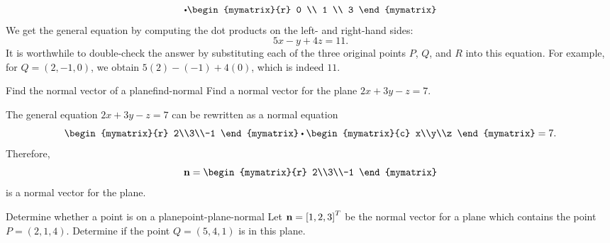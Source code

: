 \begin{solution}
\begin{equation*}
    \dotprod
    \begin{mymatrix}{r} 0 \\ 1 \\ 3 \end{mymatrix}
  \end{equation*}
  We get the general equation by computing the dot products on the
  left- and right-hand sides:
  \begin{equation*}
    5x - y + 4z = 11.
  \end{equation*}
  It is worthwhile to double-check the answer by substituting each of
  the three original points $P$, $Q$, and $R$ into this equation.
  For example, for $Q=(2,-1,0)$, we obtain $5(2)-(-1)+4(0)$, which is
  indeed $11$.
\end{solution}

\begin{example}{Find the normal vector of a plane}{find-normal}
  Find a normal vector for the plane $2x+3y-z=7$.
\end{example}

\begin{solution}
  The general equation $2x+3y-z=7$ can be rewritten as a normal
  equation
  \begin{equation*}
    \begin{mymatrix}{r} 2\\3\\-1 \end{mymatrix}
    \dotprod
    \begin{mymatrix}{c} x\\y\\z \end{mymatrix}
    = 7.
  \end{equation*}
  Therefore,
  \begin{equation*}
    \vect{n} = \begin{mymatrix}{r} 2\\3\\-1 \end{mymatrix}
  \end{equation*}
  is a normal vector for the plane.
\end{solution}

\begin{example}{Determine whether a point is on a plane}{point-plane-normal}
  Let $\mbox{\bf n} = \left[1,2,3\right]^T$ be the normal vector for a plane
  which contains the point $P = (2,1,4)$. Determine if the point
  $Q = (5,4,1)$ is in this plane.
\end{example}

